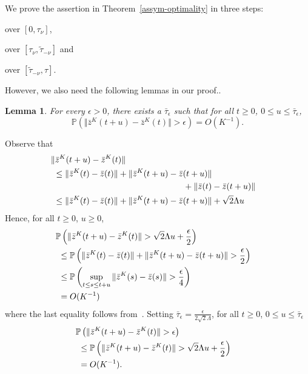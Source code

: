 \documentclass[10pt,journal,letterpaper]{IEEEtran}
\newtheorem{lemma}{Lemma}[section]
\begin{document}
We prove the assertion in Theorem~\ref{assym-optimality} in three
steps:
\begin{inparaenum}[(a)]
\item over $[0, \tau_{\nu}]$,
\item over $[ \tau_{\nu}, \tilde{\tau}_{-\nu}]$ and
\item over $[\tilde{\tau}_{-\nu}, \tau]$.
\end{inparaenum}
However, we also need the following lemmas in our proof..
\begin{lemma}
\label{epsi-tau} For every $\epsilon > 0$, there exists a
$\bar{\tau}_{\epsilon}$ such that for all $t \geq 0$, $0 \leq u \leq
\bar{\tau}_{\epsilon}$,
\[
\mathbb{P}\left(\Vert \bar{z}^K(t+u) - \bar{z}^K(t) \Vert >
\epsilon\right) = O(K^{-1}).
\]
\end{lemma}
\begin{IEEEproof}
Observe that
\begin{align*}
\lefteqn{\Vert \bar{z}^K(t+u)-\bar{z}^K(t) \Vert} \\
&~\leq \Vert \bar{z}^K(t)-\bar{z}(t) \Vert + \Vert \bar{z}^K(t+u)-\bar{z}(t+u) \Vert \\
&~ \ \ \ \ \ \ \ \ \ \ \ \ \ \ \ \ \ \ \ \ \ \ \ \ \ \ \ \ \ \ \ \ \ \ \ \ \ \ \ \ \ \ \ \ \ \ + \Vert \bar{z}(t)-\bar{z}(t+u) \Vert \\
&~\leq \Vert \bar{z}^K(t)-\bar{z}(t) \Vert + \Vert
\bar{z}^K(t+u)-\bar{z}(t+u) \Vert + \sqrt{2}\Lambda u
\end{align*}
Hence, for all $t \geq 0$, $u \geq 0$,
\begin{align*}
\lefteqn{\mathbb{P}\left(\Vert \bar{z}^K(t+u)-\bar{z}^K(t) \Vert >
\sqrt{2}\Lambda u + \frac{\epsilon}{2}\right)} \\
 &~\leq \mathbb{P}\left(\Vert \bar{z}^K(t)-\bar{z}(t) \Vert + \Vert
\bar{z}^K(t+u)-\bar{z}(t+u) \Vert > \frac{\epsilon}{2}\right) \\
&~\leq \mathbb{P}\left(\sup_{t \leq s \leq t+ u} \Vert
\bar{z}^K(s)-\bar{z}(s)
\Vert > \frac{\epsilon}{4} \right) \\
&~= O(K^{-1})
\end{align*}
where the last equality follows
from~\cite[Theorem~2.8]{stochproc.darling02fluid-limits}. Setting
$\bar{\tau}_{\epsilon} = \frac{\epsilon}{2\sqrt{2}\Lambda}$, for all
$t \geq 0$, $0 \leq u \leq \bar{\tau}_{\epsilon}$
\begin{align*}
\lefteqn{\mathbb{P}\left(\Vert \bar{z}^K(t+u)-\bar{z}^K(t) \Vert >
\epsilon
\right)} \\
&~\leq \mathbb{P}\left(\Vert \bar{z}^K(t+u)-\bar{z}^K(t) \Vert >
\sqrt{2}\Lambda u + \frac{\epsilon}{2} \right) \\
&~=O(K^{-1}).
\end{align*}
\end{IEEEproof}
\end{document}

